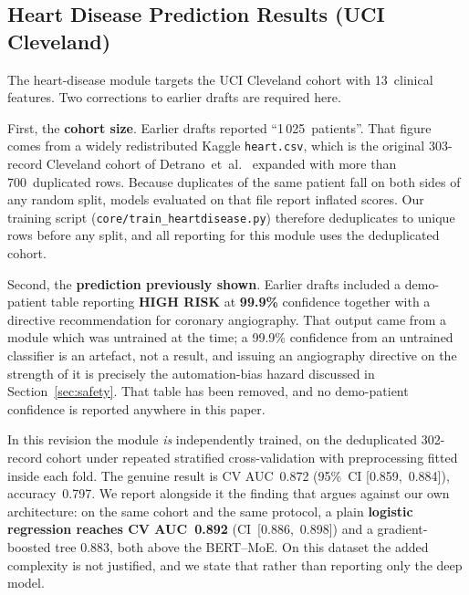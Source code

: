 \documentclass[AMA,STIX1COL,]{WileyNJD-v2}
\begin{document}
\subsection{Heart Disease Prediction Results (UCI Cleveland)}

The heart-disease module targets the UCI Cleveland cohort with
13~clinical features. Two corrections to earlier drafts are required
here.

First, the \textbf{cohort size}. Earlier drafts reported
``1\,025~patients''. That figure comes from a widely redistributed
Kaggle \texttt{heart.csv}, which is the original 303-record Cleveland
cohort of Detrano~et~al.~\cite{detrano1989} expanded with more than
700~duplicated rows.
Because duplicates of the same patient fall on both sides of any
random split, models evaluated on that file report inflated scores.
Our training script (\texttt{core/train\_heartdisease.py}) therefore
deduplicates to unique rows before any split, and all reporting for
this module uses the deduplicated cohort.

Second, the \textbf{prediction previously shown}. Earlier drafts
included a demo-patient table reporting \textbf{HIGH RISK} at
\textbf{99.9\%} confidence together with a directive recommendation
for coronary angiography. That output came from a module which was
untrained at the time; a 99.9\% confidence from an untrained
classifier is an artefact, not a result, and issuing an angiography
directive on the strength of it is precisely the automation-bias
hazard discussed in Section~\ref{sec:safety}. That table has been
removed, and no demo-patient confidence is reported anywhere in this
paper.

In this revision the module \emph{is} independently trained, on the
deduplicated 302-record cohort under repeated stratified
cross-validation with preprocessing fitted inside each fold. The
genuine result is CV AUC~0.872 (95\%~CI [0.859,~0.884]),
accuracy~0.797. We report alongside it the finding that argues against
our own architecture: on the same cohort and the same protocol, a
plain \textbf{logistic regression reaches CV AUC~0.892}
(CI~[0.886,~0.898]) and a gradient-boosted tree 0.883, both above the
BERT--MoE. On this dataset the added complexity is not justified, and
we state that rather than reporting only the deep model.

\end{document}
